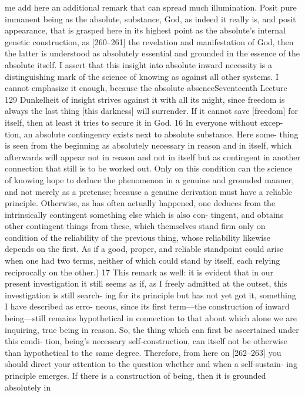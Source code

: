 me add here an additional remark that can spread much illumination. Posit
pure immanent being as the absolute, substance, God, as indeed it really is,
and posit appearance, that is grasped here in its highest point as the absolute’s
internal genetic construction, as [260–261] the revelation and manifestation
of God, then the latter is understood as absolutely essential and grounded in
the essence of the absolute itself. I assert that this insight into absolute inward
necessity is a distinguishing mark of the science of knowing as against all
other systems. I cannot emphasize it enough, because the absolute absenceSeventeenth Lecture
129
{Dunkelheit} of insight strives against it with all its might, since freedom is
always the last thing [this darkness] will surrender. If it cannot save [freedom]
for itself, then at least it tries to secure it in God. 16 In everyone without excep-
tion, an absolute contingency exists next to absolute substance. Here some-
thing is seen from the beginning as absolutely necessary in reason and in itself,
which afterwards will appear not in reason and not in itself but as contingent
in another connection that still is to be worked out. Only on this condition
can the science of knowing hope to deduce the phenomenon in a genuine and
grounded manner, and not merely as a pretense; because a genuine derivation
must have a reliable principle. Otherwise, as has often actually happened, one
deduces from the intrinsically contingent something else which is also con-
tingent, and obtains other contingent things from these, which themselves
stand firm only on condition of the reliability of the previous thing, whose
reliability likewise depends on the first. As if a good, proper, and reliable
standpoint could arise when one had two terms, neither of which could stand
by itself, each relying reciprocally on the other.) 17
This remark as well: it is evident that in our present investigation it still
seems as if, as I freely admitted at the outset, this investigation is still search-
ing for its principle but has not yet got it, something I have described as erro-
neous, since its first term—the construction of inward being—still remains
hypothetical in connection to that about which alone we are inquiring, true
being in reason. So, the thing which can first be ascertained under this condi-
tion, being’s necessary self-construction, can itself not be otherwise than
hypothetical to the same degree. Therefore, from here on [262–263] you
should direct your attention to the question whether and when a self-sustain-
ing principle emerges.
If there is a construction of being, then it is grounded absolutely in
